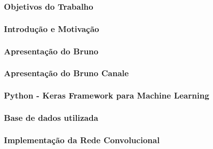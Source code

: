 \documentclass[tikz,11pt]{beamer}
\begin{document}
\begin{frame}
	\frametitle{Objetivos do Trabalho}
\end{frame}

\begin{frame}
	\frametitle{Introdução e Motivação}
\end{frame}

\begin{frame}
	\frametitle{Apresentação do Bruno}
\end{frame}

\begin{frame}
	\frametitle{Apresentação do Bruno Canale}
\end{frame}

\begin{frame}
	\frametitle{Python - Keras Framework para Machine Learning}
\end{frame}

\begin{frame}
	\frametitle{Base de dados utilizada}
\end{frame}

\begin{frame}
	\frametitle{Implementação da Rede Convolucional}
\end{frame}

\end{document}
